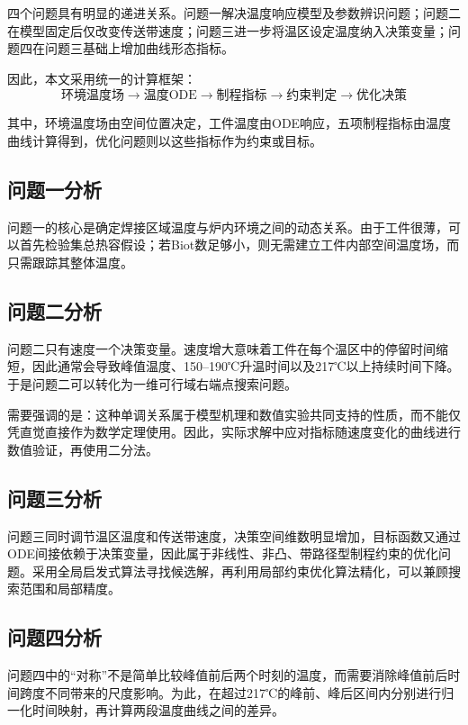 \documentclass{cumcmthesis}
\begin{document}
四个问题具有明显的递进关系。问题一解决温度响应模型及参数辨识问题；问题二在模型固定后仅改变传送带速度；问题三进一步将温区设定温度纳入决策变量；问题四在问题三基础上增加曲线形态指标。

因此，本文采用统一的计算框架：
\[
\boxed{
\text{环境温度场}
\longrightarrow
\text{温度ODE}
\longrightarrow
\text{制程指标}
\longrightarrow
\text{约束判定}
\longrightarrow
\text{优化决策}
}
\]

其中，环境温度场由空间位置决定，工件温度由ODE响应，五项制程指标由温度曲线计算得到，优化问题则以这些指标作为约束或目标。

\subsection{问题一分析}

问题一的核心是确定焊接区域温度与炉内环境之间的动态关系。由于工件很薄，可以首先检验集总热容假设；若Biot数足够小，则无需建立工件内部空间温度场，而只需跟踪其整体温度。

\subsection{问题二分析}

问题二只有速度一个决策变量。速度增大意味着工件在每个温区中的停留时间缩短，因此通常会导致峰值温度、150--190℃升温时间以及217℃以上持续时间下降。于是问题二可以转化为一维可行域右端点搜索问题。

需要强调的是：这种单调关系属于模型机理和数值实验共同支持的性质，而不能仅凭直觉直接作为数学定理使用。因此，实际求解中应对指标随速度变化的曲线进行数值验证，再使用二分法。

\subsection{问题三分析}

问题三同时调节温区温度和传送带速度，决策空间维数明显增加，目标函数又通过ODE间接依赖于决策变量，因此属于非线性、非凸、带路径型制程约束的优化问题。采用全局启发式算法寻找候选解，再利用局部约束优化算法精化，可以兼顾搜索范围和局部精度。

\subsection{问题四分析}

问题四中的“对称”不是简单比较峰值前后两个时刻的温度，而需要消除峰值前后时间跨度不同带来的尺度影响。为此，在超过217℃的峰前、峰后区间内分别进行归一化时间映射，再计算两段温度曲线之间的差异。
\end{document}
